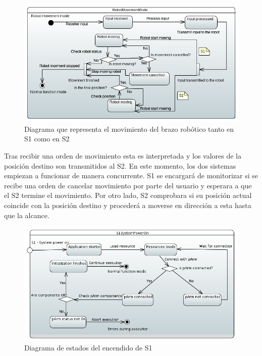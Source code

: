 \begin{figure}[H]
    \centering
    \includegraphics[width=\linewidth]{pictures/S1RobotMovementMode.PNG}
    \caption{Diagrama que representa el movimiento del brazo robótico tanto en \ac{S1} como en \ac{S2}}
    \label{fig:diagrama_estados_movimiento_s1}
\end{figure}

Tras recibir una orden de movimiento esta es interpretada y los valores de la posición destino son transmitidos al \ac{S2}. En este momento, los dos sistemas empiezan a funcionar de manera concurrente.
\ac{S1} se encargará de monitorizar si se recibe una orden de cancelar movimiento por parte del usuario y esperara a que el \ac{S2} termine el movimiento.
Por otro lado, \ac{S2} comprobara si su posición actual coincide con la posición destino y procederá a moverse en dirección a esta hasta que la alcance.

\begin{figure}[H]
    \centering
    \includegraphics[width=\linewidth]{pictures/S1SystemPowerOn.PNG}
    \caption{Diagrama de estados del encendido de \ac{S1}}
    \label{fig:diagrama_estados_encendido_s1}
\end{figure}

